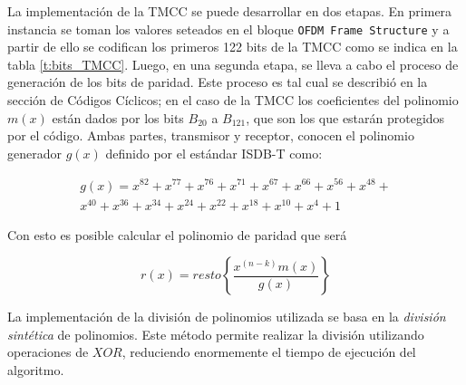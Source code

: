 La implementación de la TMCC se puede desarrollar en dos etapas. En primera instancia se toman los valores seteados en el bloque \verb|OFDM Frame Structure| y a partir de ello se codifican los primeros 122 bits de la TMCC como se indica en la tabla \ref{t:bits_TMCC}. Luego, en una segunda etapa, se lleva a cabo el proceso de generación de los bits de paridad. Este proceso es tal cual se describió en la sección de Códigos Cíclicos; en el caso de la TMCC los coeficientes del polinomio $m(x)$ están dados por los bits $B_{20}$ a $B_{121}$, que son los que estarán protegidos por el código. Ambas partes, transmisor y receptor, conocen el polinomio generador $g(x)$ definido por el estándar ISDB-T como:

\begin{equation}
\begin{split}
g(x) = x^{82}+x^{77}+x^{76}+x^{71}+x^{67}+x^{66}+x^{56}+x^{48}+\\x^{40}+x^{36}+x^{34}+x^{24}+x^{22}+x^{18}+x^{10}+x^{4}+1
\end{split}
\end{equation}

Con esto es posible calcular el polinomio de paridad que será 

\begin{equation}
r(x)= resto \left\{ \dfrac{x^{(n-k)}m(x)}{g(x)} \right\}
\end{equation}

La implementación de la división de polinomios utilizada se basa en la \textit{división sintética} de polinomios. Este método permite realizar la división utilizando operaciones de $XOR$, reduciendo enormemente el tiempo de ejecución del algoritmo.


